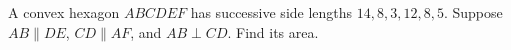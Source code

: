 A convex hexagon $ABCDEF$ has successive side lengths $14,8,3,12,8,5$. Suppose $AB\parallel DE$, $CD\parallel AF$, and $AB\perp CD$. Find its area.
